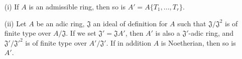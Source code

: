 \begin{proposition}[7.5.4]
\label{0.7.5.4}
\medskip\noindent
\begin{enumerate}
  \item[{\rm(i)}] If $A$ is an admissible ring, then so is $A'=A\{T_1,\dots,T_r\}$.
  \item[{\rm(ii)}] Let $A$ be an adic ring, $\mathfrak{J}$ an ideal of definition for
    $A$ such that $\mathfrak{J}/\mathfrak{J}^2$ is of finite type
    over $A/\mathfrak{J}$. If we set $\mathfrak{J}'=\mathfrak{J}A'$, then $A'$ is also a
    $\mathfrak{J}'$-adic ring, and $\mathfrak{J}'/{\mathfrak{J}'}^2$ is of finite type over
    $A'/\mathfrak{J}'$. If in addition $A$ is Noetherian, then so is $A'$.
\end{enumerate}
\end{proposition}

